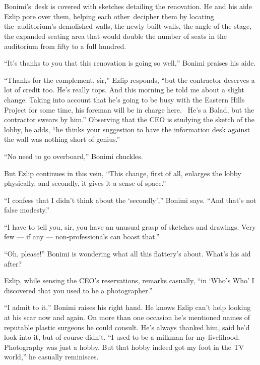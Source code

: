 \documentclass[twoside,11pt,openany]{book}
\begin{document}
\chapter{}

Bonimi's~desk is covered{ }with sketches detailing the renovation. He and his aide Ezlip pore over them,
helping each other~decipher them by locating the~auditorium's demolished walls, the newly built walls, the angle of the
stage, the expanded seating area that would double the number of seats in the auditorium from fifty to a
full{ }hundred.

{}``It's thanks to you that this renovation is going so well,'' Bonimi{ }praises his aide.

``Thanks for the complement, sir,'' Ezlip responds, ``but the contractor deserves
a lot of credit too. He's really tops. And this morning he told me about a slight change. Taking into account that he's
going to be busy with the Eastern Hills Project for some time, his foreman will be in charge here. ~He's a Balad, but
the contractor swears{ }by him.'' Observing that the CEO is studying the sketch of the
lobby, he adds, ``he thinks your suggestion to{ }have the information desk against the
wall was nothing short of genius.''

``No need to go overboard,'' Bonimi chuckles.

But Ezlip continues in this vein, ``This change, first of all, enlarges the lobby physically, and secondly,
it gives it a sense of space.''

``I confess that I didn't think about the `secondly','' Bonimi says. ``And that's
not false modesty.''

``I have to tell you, sir, you have an unusual grasp of sketches and drawings. Very few --- if any ---
non-professionals can boast that.''

``Oh, please!'' Bonimi is wondering what all this flattery's about. What's his aid after?

Ezlip, while sensing the CEO's reservations, remarks casually, ``in `Who's Who' I discovered that you used
to be a photographer.''

``I admit to it,'' Bonimi raises his right hand. He knows Ezlip can't help looking at his scar
now and again. On more than one occasion he's mentioned names of reputable{ }plastic surgeons he could
consult. He's always thanked him, said he'd look into it, but of course didn't. ``I used to be a milkman
for my livelihood. Photography was just a hobby. But that hobby indeed got my foot in the TV world,'' he
casually reminisces.
\end{document}
